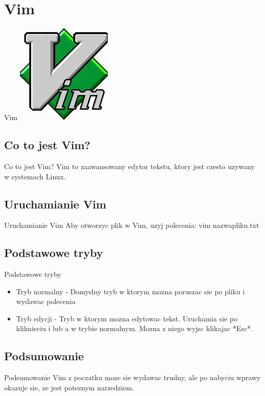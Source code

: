 \documentclass{beamer}
\begin{document}
\section{Vim}
\begin{frame}{Vim}
\centering
\includegraphics{vim.png}
\end{frame}

\subsection{Co to jest Vim?}
\begin{frame}{Co to jest Vim?}
Vim to zaawansowany edytor tekstu, ktory jest czesto uzywany w systemach Linux.
\end{frame}

\subsection{Uruchamianie Vim}
\begin{frame}{Uruchamianie Vim}
Aby otworzyc plik w Vim, uzyj polecenia:
vim nazwapliku.txt
\end{frame}

\subsection{Podstawowe tryby}
\begin{frame}{Podstawowe tryby}
\begin{itemize}
\item Tryb normalny - Domyslny tryb w ktorym mozna poruszac sie po pliku i wydawac polecenia
\item Tryb edycji - Tryb w ktorym mozna edytowac tekst. Uruchamia sie po kliknieciu i lub a w trybie normalnym. Mozna z niego wyjsc klikajac *Esc*.
\end{itemize}
\end{frame}

\subsection{Podsumowanie}
\begin{frame}{Podsumowanie}
Vim z poczatku moze sie wydawac trudny, ale po nabyciu wprawy okazuje sie, ze jest poteznym narzedziem.
\end{frame}
\end{document}
